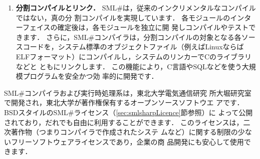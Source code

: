 \documentclass{jbook}
\newcommand{\smlsharp}{SML\#}
\begin{document}
\begin{enumerate}
\item {\bf 分割コンパイルとリンク．}
	\smlsharp{}は，従来のインクリメンタルなコンパイルではない，真の分
割コンパイルを実現しています．
	各モジュールのインターフェイスの確定後は，各モジュールを独立に開
発しコンパイルやテストできます．
	さらに，\smlsharp{}コンパイラは，分割コンパイルの対象となる各ソー
スコードを，システム標準のオブジェクトファイル（例えばLinuxならば
ELFフォーマット）にコンパイルし，システムのリンカーでCのライブラリなどと
ともにリンクします．
	この機能により，C言語やSQLなどを使う大規模プログラムを安全かつ効
率的に開発です．

\end{enumerate}

	\smlsharp{}コンパイラおよび実行時処理系は，東北大学電気通信研究
所大堀研究室で開発され，東北大学が著作権保有するオープンソースソフトウエ
アです．
	BSDスタイルの\smlsharp{}ライセンス（\ref{sec:smlsharpLicence}節参照）に
よって公開されており，だれでも自由に利用することができます．
	このライセンスは，二次著作物（つまりコンパイラで作成されたシステ
ムなど）に関する制限の少ないフリーソフトウェアライセンスであり，企業の商
品開発にも安心して使用できます．
\end{document}
